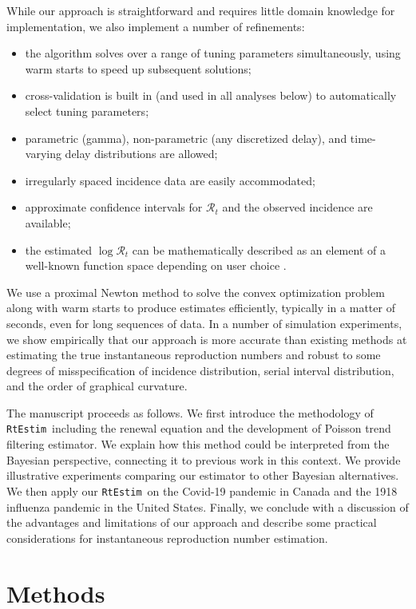 \documentclass[10pt,letterpaper]{article}
\def\RtEstim{\texttt{RtEstim}}
\def\calR{\mathcal{R}}
\begin{document}
While our approach is straightforward and requires little domain knowledge for
implementation, we also implement a number of refinements:
\begin{itemize}
  \item the algorithm solves over a range of tuning parameters simultaneously,
  using warm starts to speed up subsequent solutions;
  \item cross-validation is built in (and used in all analyses below) to
  automatically select tuning parameters;
  \item parametric (gamma), non-parametric (any discretized delay), and
  time-varying delay distributions are allowed;
  \item irregularly spaced incidence data are easily accommodated;
  \item approximate confidence intervals for $\calR_t$ and the observed
  incidence are available;
  \item the estimated $\log\calR_t$ can be mathematically described as an
  element of a well-known function space depending on user choice \cite{tibshirani2022divided}.
\end{itemize}
We use a proximal Newton method to solve the convex optimization problem along
with warm starts to produce estimates efficiently, typically in a matter of
seconds, even for long sequences of data. In a number of simulation experiments,
we show empirically that our approach is more accurate than existing methods at
estimating the true instantaneous reproduction numbers and robust to some
degrees of misspecification of incidence distribution, serial interval
distribution, and the order of graphical curvature. 


The manuscript proceeds as follows. We first introduce the methodology of
\RtEstim\ including the renewal equation and the development of Poisson trend
filtering estimator. We explain how this method could be interpreted from the
Bayesian perspective, connecting it to previous work in this context. We provide
illustrative experiments comparing our estimator to other Bayesian alternatives.
We then apply our \RtEstim\ on the Covid-19 pandemic in Canada and the 1918
influenza pandemic in the United States. Finally, we conclude with a discussion
of the advantages and limitations of our approach and describe some practical
considerations for instantaneous reproduction number estimation.


\section{Methods}
\end{document}

